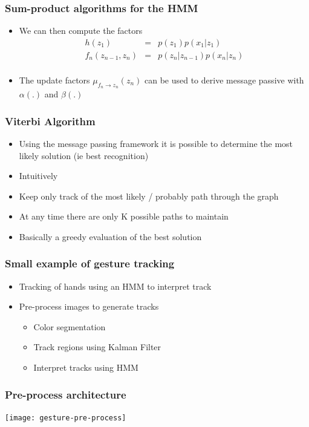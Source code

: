 \documentclass[10pt]{beamer}
\begin{document}
\begin{frame}
  \frametitle{Sum-product algorithms for the HMM}
  \begin{itemize}
  \item We can then compute the factors
    \begin{eqnarray*}
      h(z_1) &=& p(z_1) p(x_1 | z_1)\\
      f_n(z_{n-1}, z_n) &=& p(z_n|z_{n-1}) p(x_n|z_n)\\
    \end{eqnarray*}
  \item The update factors $\mu_{f_n \rightarrow z_n}(z_n)$ can be
    used to derive message passive with $\alpha(.)$ and $\beta(.)$
  \end{itemize}
\end{frame}

\begin{frame}
  \frametitle{Viterbi Algorithm}
  \begin{itemize}
  \item Using the message passing framework it is possible to
    determine the most likely solution (ie best recognition)
  \item Intuitively
  \item Keep only track of the most likely / probably path through the
    graph
  \item At any time there are only K possible paths to maintain
  \item Basically a greedy evaluation of the best solution
  \end{itemize}
\end{frame}

\begin{frame}
  \frametitle{Small example of gesture tracking}
  \begin{itemize}
  \item Tracking of hands using an HMM to interpret track
  \item Pre-process images to generate tracks
    \begin{itemize}
    \item Color segmentation
    \item Track regions using Kalman Filter
    \item Interpret tracks using HMM
    \end{itemize}
  \end{itemize}
\end{frame}

\begin{frame}
  \frametitle{Pre-process architecture}
  \begin{center}
    \texttt{[image: gesture-pre-process]}
  \end{center}
\end{frame}
\end{document}
